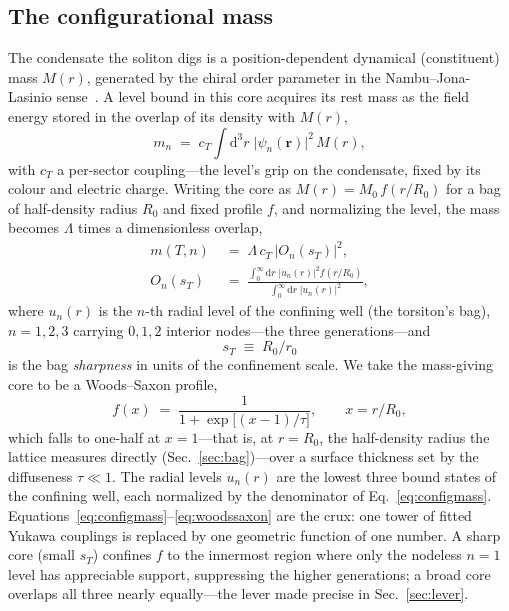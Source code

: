 \documentclass[aps,prd,reprint,nofootinbib,superscriptaddress]{revtex4-2}
\newcommand{\sT}{s_{T}}
\begin{document}
\subsection{The configurational mass}
\label{sec:configmass}
The condensate the soliton digs is a position-dependent dynamical (constituent) mass $M(r)$, generated
by the chiral order parameter in the Nambu--Jona-Lasinio sense~\citep{nambu1961, diakonov1988}. A level
bound in this core acquires its rest mass as the field energy stored in the overlap of its density with
$M(r)$,
\begin{equation}
  m_n \;=\; c_T\!\int\! \mathrm{d}^3 r\; \bigl|\psi_n(\mathbf{r})\bigr|^{2}\, M(r),
  \label{eq:mass-overlap}
\end{equation}
with $c_T$ a per-sector coupling---the level's grip on the condensate, fixed by its colour and electric
charge. Writing the core as $M(r) = M_0\, f(r/R_0)$ for a bag of half-density radius $R_0$ and fixed
profile $f$, and normalizing the level, the mass becomes $\Lambda$ times a dimensionless overlap,
\begin{equation}
\begin{aligned}
  m(T,n) &\;=\; \Lambda\, c_T\,\bigl|O_n(\sT)\bigr|^{2}, \\[5pt]
  O_n(\sT) &\;=\;
  \frac{\displaystyle\int_0^\infty\! \mathrm{d}r\; \bigl|u_n(r)\bigr|^{2} f(r/R_0)}
       {\displaystyle\int_0^\infty\! \mathrm{d}r\; \bigl|u_n(r)\bigr|^{2}},
\end{aligned}
\label{eq:configmass}
\end{equation}
where $u_n(r)$ is the $n$-th radial level of the confining well (the torsiton's bag), $n=1,2,3$ carrying
$0,1,2$ interior nodes---the three generations---and
\begin{equation}
  \sT \;\equiv\; R_0/r_0
  \label{eq:sT}
\end{equation}
is the bag \emph{sharpness} in units of the confinement scale. We take the mass-giving core to be a
Woods--Saxon profile,
\begin{equation}
  f(x) \;=\; \frac{1}{1 + \exp\!\bigl[(x-1)/\tau\bigr]},
  \qquad x = r/R_0,
  \label{eq:woodssaxon}
\end{equation}
which falls to one-half at $x=1$---that is, at $r=R_0$, the half-density radius the lattice measures
directly (Sec.~\ref{sec:bag})---over a surface thickness set by the diffuseness $\tau \ll 1$. The radial
levels $u_n(r)$ are the lowest three bound states of the confining well, each normalized by the
denominator of Eq.~\eqref{eq:configmass}. Equations~\eqref{eq:configmass}--\eqref{eq:woodssaxon} are the
crux: one tower of fitted Yukawa couplings is replaced by one geometric function of one number. A sharp
core (small $\sT$) confines $f$ to the innermost region where only the nodeless $n=1$ level has
appreciable support, suppressing the higher generations; a broad core overlaps all three nearly
equally---the lever made precise in Sec.~\ref{sec:lever}.
\end{document}
